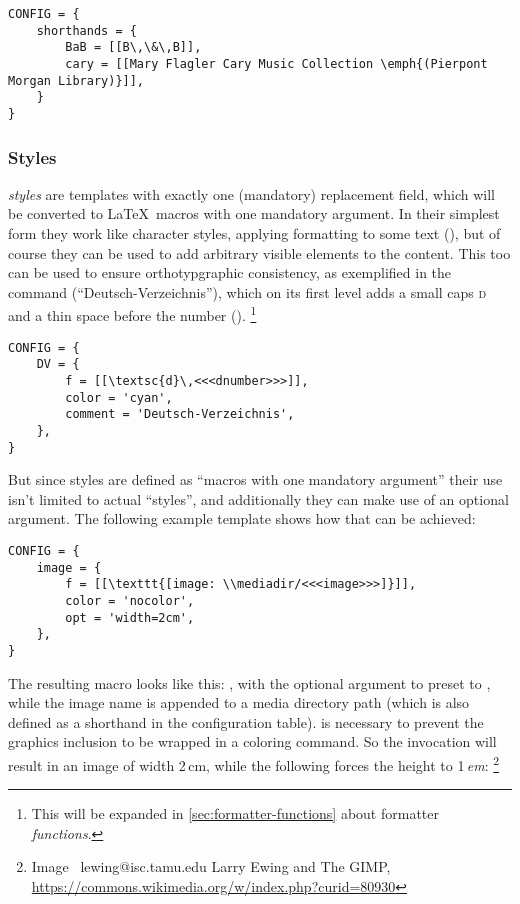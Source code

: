 \documentclass{scrartcl}
\begin{document}
\begin{verbatim}
CONFIG = {
    shorthands = {
        BaB = [[B\,\&\,B]],
        cary = [[Mary Flagler Cary Music Collection \emph{(Pierpont Morgan Library)}]],
    }
}
\end{verbatim}


\subsubsection{Styles}
\label{sec:styles}

\emph{styles} are templates with exactly one (mandatory) replacement field,
which will be converted to \LaTeX\ macros with one mandatory argument.  In their
simplest form they work like character styles, applying formatting to some text
(), but of course they can be used
to add arbitrary visible elements to the content.  This too can be used to
ensure orthotypgraphic consistency, as exemplified in the command 
(“Deutsch-Verzeichnis”), which on its first level adds a small caps \textsc{d}
and a thin space before the number
().%
\footnote{This will be expanded in \vref{sec:formatter-functions} about formatter
\emph{functions}.}

\begin{verbatim}
CONFIG = {
    DV = {
        f = [[\textsc{d}\,<<<dnumber>>>]],
        color = 'cyan',
        comment = 'Deutsch-Verzeichnis',
    },
}
\end{verbatim}

\noindent But since styles are defined as “macros with one mandatory argument”
their use isn't limited to actual “styles”, and additionally they can make use
of an optional argument.  The following example template shows how that can be
achieved:

\begin{verbatim}
CONFIG = {
    image = {
        f = [[\texttt{[image: \\mediadir/<<<image>>>]}]],
        color = 'nocolor',
        opt = 'width=2cm',
    },
}
\end{verbatim}

\noindent The resulting macro looks like this: , with
the optional argument to  preset to ,
while the image name is appended to a media directory path (which is also
defined as a shorthand in the configuration table).   is
necessary to prevent the graphics inclusion to be wrapped in a coloring command.
So the invocation \texttt{} will result in an image of width 2\,cm,
while the following forces the height to 1\,\emph{em}:
%
\footnote{Image \textcopyright\ lewing@isc.tamu.edu Larry Ewing and The GIMP,
\url{https://commons.wikimedia.org/w/index.php?curid=80930}}
\end{document}
